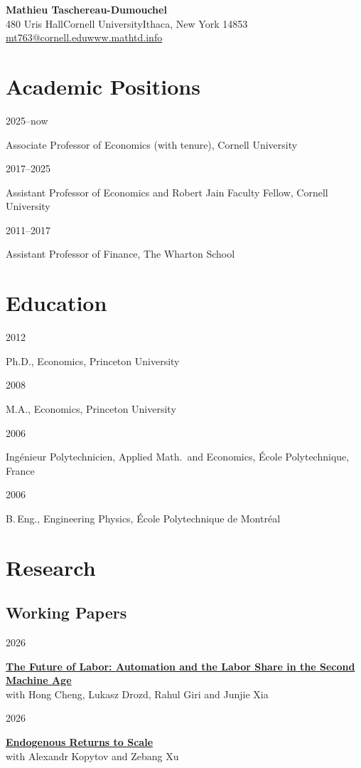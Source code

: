 \documentclass[letterpaper,11pt]{article}
\newcommand{\sep}{\enspace\textperiodcentered\enspace}
\newcommand{\entry}[2]{\noindent\parbox[t]{0.12\textwidth}{\small #1}\begin{minipage}[t]{0.88\textwidth}#2\end{minipage}\par\vspace{0.7em}}
\begin{document}
\thispagestyle{empty} 

\begin{center}
  {\huge\bfseries\color{accent}Mathieu Taschereau-Dumouchel}\\[0.45em]
  {\small 480 Uris Hall\sep Cornell University\sep Ithaca, New York 14853}\\[0.2em]
  {\small \href{mailto:mt763@cornell.edu}{mt763@cornell.edu}\sep\href{https://www.mathtd.info}{www.mathtd.info}}\\[0.2em]
\end{center}
\vspace{0.5em}

\section{Academic Positions}
\entry{2025--now}{Associate Professor of Economics (with tenure), Cornell University}
\entry{2017--2025}{Assistant Professor of Economics and Robert Jain Faculty Fellow, Cornell University}
\entry{2011--2017}{Assistant Professor of Finance, The Wharton School}

\section{Education}
\entry{2012}{Ph.D., Economics, Princeton University}
\entry{2008}{M.A., Economics, Princeton University}
\entry{2006}{Ingénieur Polytechnicien, Applied Math.\ and Economics, École Polytechnique, France}
\entry{2006}{B.\,Eng., Engineering Physics, École Polytechnique de Montréal}

\section{Research}

\subsection{Working Papers}
\entry{2026}{\textbf{\href{https://www.mathtd.info/files/papers/china_automation/paper.pdf}{The Future of Labor: Automation and the Labor Share in the Second Machine Age}}\\
with Hong Cheng, Lukasz Drozd, Rahul Giri and Junjie Xia}
\entry{2026}{\textbf{\href{https://www.mathtd.info/files/papers/Endogenous_RTS/paper.pdf}{Endogenous Returns to Scale}}\\
with Alexandr Kopytov and Zebang Xu}
\end{document}
